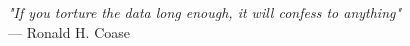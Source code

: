 \begin{flushright}
\emph{"If you torture the data long enough, it will confess to anything"}\\
— Ronald H. Coase
\end{flushright}